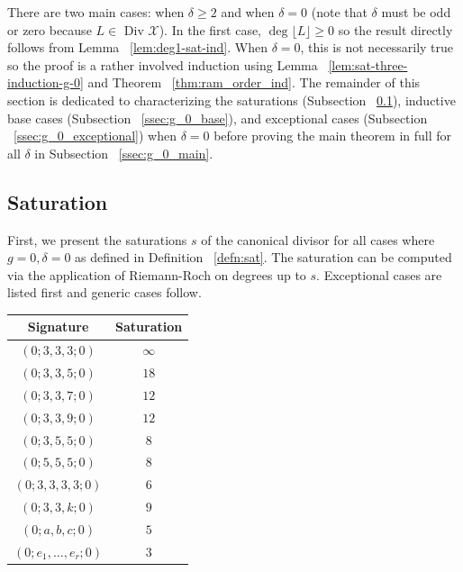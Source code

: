 \documentclass{amsart}
\theoremstyle{plain}
\theoremstyle{definition}
\theoremstyle{remark}
\numberwithin{equation}{section}
\newcommand\ssec{\subsection}
\newcommand \sx{\mathscr X}
\newcommand \halfcan{L}
\begin{document}
There are two main cases: when $\delta \geq 2$ and when $\delta = 0$
 (note that $\delta$ must be odd or zero because $\halfcan \in \text
{ Div } \sx$). In the first case, $\deg \lfloor \halfcan \rfloor
\geq 0$ so the result directly follows from Lemma
~\ref{lem:deg1-sat-ind}. When $\delta = 0$, this is not necessarily
true so the proof is a rather involved induction using Lemma
~\ref{lem:sat-three-induction-g-0} and Theorem ~\ref{thm:ram_order_ind}.
The remainder of this section is dedicated to characterizing the
saturations (Subsection ~\ref{ssec:g_0_saturation}), inductive
base cases (Subsection ~\ref{ssec:g_0_base}), and exceptional
cases (Subsection ~\ref{ssec:g_0_exceptional}) when $\delta = 0$
before proving the main theorem in full for all $\delta$ in
Subsection ~\ref{ssec:g_0_main}.

\ssec{Saturation}
\label{ssec:g_0_saturation}
First, we present the saturations $s$ of the canonical divisor for
all cases where $g = 0, \delta = 0$ as defined in Definition
~\ref{defn:sat}. The saturation can be computed via the application
of Riemann-Roch on degrees up to $s$. Exceptional cases are listed
first and generic cases follow.

\begin{longtable}
	{| c | c |}
	\hline
	Signature & Saturation \\
	\hline
	\hline

	$(0; 3, 3, 3; 0)$ & $\infty$ \\	\hline

	$(0; 3, 3, 5; 0)$ & $18$ \\	\hline
	
	$(0; 3, 3, 7; 0)$ & $12$ \\	\hline
	
	$(0; 3, 3, 9; 0)$ & $12$ \\	\hline
	
	$(0; 3, 5, 5; 0)$ & $8$ \\	\hline
	
	$(0; 5, 5, 5; 0)$ & $8$ \\	\hline
	
	$(0; 3, 3, 3, 3; 0)$ & $6$ \\	\hline
	
	\hline
	\hline
	
	$(0; 3, 3, k; 0)$ & $9$ \\	\hline
	
	$(0; a, b, c; 0)$ & $5$ \\	\hline
	
	$(0; e_1, \ldots, e_r; 0)$ & $3$ \\	\hline
\end{longtable}
\end{document}
